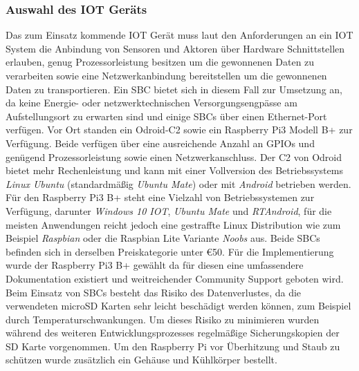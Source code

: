 \documentclass[BMR,Bachelor,ngerman]{twbook}%
\begin{document}
\subsubsection{Auswahl des \ac{IOT} Geräts}
Das zum Einsatz kommende \ac{IOT} Gerät muss laut den Anforderungen an ein \ac{IOT} System die Anbindung von Sensoren und Aktoren über Hardware Schnittstellen erlauben, genug Prozessorleistung besitzen um die gewonnenen Daten zu verarbeiten sowie eine Netzwerkanbindung bereitstellen um die gewonnenen Daten zu transportieren. Ein \ac{SBC} bietet sich in diesem Fall zur Umsetzung an, da keine Energie- oder netzwerktechnischen Versorgungsengpässe am Aufstellungsort zu erwarten sind und einige \acp{SBC} über einen Ethernet-Port verfügen.
%
Vor Ort standen ein Odroid-C2 sowie ein Raspberry Pi3 Modell B+ zur Verfügung. Beide verfügen über eine ausreichende Anzahl an \acp{GPIO} und genügend Prozessorleistung sowie einen Netzwerkanschluss. Der C2 von Odroid bietet mehr Rechenleistung und kann mit einer Vollversion des Betriebssystems \emph{Linux Ubuntu} (standardmäßig \emph{Ubuntu  Mate}) oder mit \emph{Android} betrieben werden. Für den  Raspberry Pi3 B+ steht eine Vielzahl von Betriebssystemen zur Verfügung, darunter \emph{Windows 10 IOT}, \emph{Ubuntu Mate} und \emph{RTAndroid}, für die meisten Anwendungen reicht jedoch eine gestraffte Linux Distribution wie zum Beispiel \emph{Raspbian} oder die Raspbian Lite Variante \emph{Noobs} aus. Beide \acp{SBC} befinden sich in derselben Preiskategorie unter \euro{50}. Für die Implementierung wurde der Raspberry Pi3 B+ gewählt da für diesen eine umfassendere Dokumentation existiert und weitreichender Community Support geboten wird.\\\newline
%
Beim Einsatz von \acp{SBC} besteht das Risiko des Datenverlustes, da die verwendeten microSD Karten sehr leicht beschädigt werden können, zum Beispiel durch Temperaturschwankungen. Um dieses Risiko zu minimieren wurden während des weiteren Entwicklungsprozesses regelmäßige Sicherungskopien der SD Karte vorgenommen. Um den Raspberry Pi vor Überhitzung und Staub zu schützen wurde zusätzlich ein Gehäuse und Kühlkörper bestellt.
%
\end{document}
